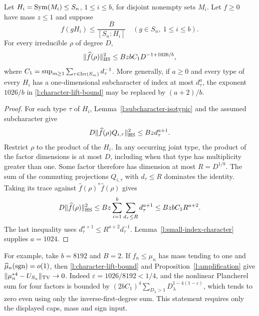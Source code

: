 \begin{theorem}
\label{l:character-lift}
Let $H_i=\operatorname{Sym}(M_i)\le S_n$, $1\le i\le b$, for disjoint nonempty
sets $M_i$.  Let $f\ge0$ have mass $z\le1$ and suppose
\[
 f(gH_i)\le\frac B{[S_n:H_i]}
       \quad(g\in S_n,\ 1\le i\le b).
\]
For every irreducible $\rho$ of degree $D$,
\begin{equation}\label{l:character-lift-bound}
 \|\widehat f(\rho)\|_{\mathrm{HS}}^2
 \le BzbC_1D^{-1+1026/b},
\end{equation}
where $C_1=\sup_{m\ge1}\sum_{\tau\in\operatorname{Irr}(S_m)}d_\tau^{-1}$.
More generally, if $a\ge0$ and every type of every $H_i$ has a one-dimensional
subcharacter of index at most $d_\tau^a$, the exponent $1026/b$
in \eqref{l:character-lift-bound} may be replaced by $(a+2)/b$.
\end{theorem}
\begin{proof}
For each type $\tau$ of $H_i$, Lemma~\ref{l:subcharacter-isotypic}
and the assumed subcharacter give
\[
 D\|\widehat f(\rho)Q_{i,\tau}\|_{\mathrm{HS}}^2
       \le Bz d_\tau^{a+1}.
\]
Restrict $\rho$ to the product of the $H_i$.  In any occurring
joint type, the product of the factor dimensions is at most $D$,
including when that type has multiplicity greater than one.
Some factor therefore has dimension at most $R=D^{1/b}$.  The sum
of the commuting projections $Q_{i,\tau}$ with $d_\tau\le R$
dominates the identity.  Taking its trace against
$\widehat f(\rho)^*\widehat f(\rho)$ gives
\[
 D\|\widehat f(\rho)\|_{\mathrm{HS}}^2
 \le Bz\sum_{i=1}^b\sum_{d_\tau\le R}d_\tau^{a+1}
 \le BzbC_1R^{a+2}.
\]
The last inequality uses
$d_\tau^{a+1}\le R^{a+2}d_\tau^{-1}$.
Lemma~\ref{l:small-index-character} supplies $a=1024$.
\end{proof}

For example, take $b=8192$ and $B=2$.  If $f_n\le\mu_n$ has
mass tending to one and $\widehat\mu_n(\operatorname{sgn})=o(1)$, then
\eqref{l:character-lift-bound} and Proposition~\ref{l:amplification}
give $\|\mu_n^{*4}-U_{S_n}\|_{\mathrm{TV}}\to0$.
Indeed $\varepsilon=1026/8192<1/4$, and the nonlinear Plancherel
sum for four factors is bounded by
$(2bC_1)^4\sum_{D_\lambda>1}D_\lambda^{1-4(1-\varepsilon)}$,
which tends to zero even using only the inverse-first-degree sum.
This statement requires only the displayed caps, mass and sign input.
